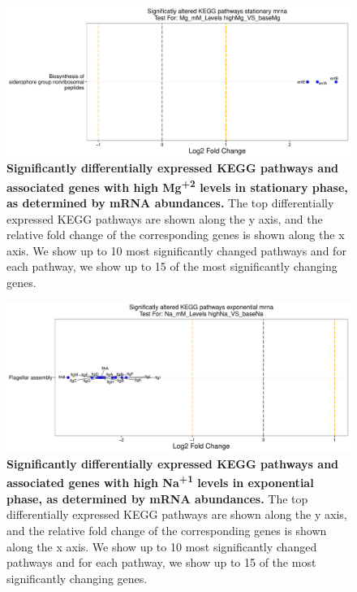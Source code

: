\documentclass[a4paper]{article}
\begin{document}
\clearpage
\begin{figure}
	\includegraphics[width=1.0\textwidth]{../../d_figures/kegg_12.pdf}
	\caption[Significantly altered KEGG pathways for mRNA samples in stationary phase tested for high Mg\textsuperscript{+2} against base Mg\textsuperscript{+2}]
	{\textbf{Significantly differentially expressed KEGG pathways and associated genes with high Mg\textsuperscript{+2} levels in stationary phase, as determined by mRNA abundances.} The top differentially expressed KEGG pathways are shown along the y axis, and the relative fold change of the corresponding genes is shown along the x axis. We show up to 10 most significantly changed pathways and for each pathway, we show up to 15 of the most significantly changing genes.}
\end{figure}

\clearpage
\begin{figure}
	\includegraphics[width=1.0\textwidth]{../../d_figures/kegg_13.pdf}
	\caption[Significantly altered KEGG pathways for mRNA samples in exponential phase tested for high Na\textsuperscript{+1} against base Na\textsuperscript{+1}]
	{\textbf{Significantly differentially expressed KEGG pathways and associated genes with high Na\textsuperscript{+1} levels in exponential phase, as determined by mRNA abundances.} The top differentially expressed KEGG pathways are shown along the y axis, and the relative fold change of the corresponding genes is shown along the x axis. We show up to 10 most significantly changed pathways and for each pathway, we show up to 15 of the most significantly changing genes.}
\end{figure}
\end{document}
